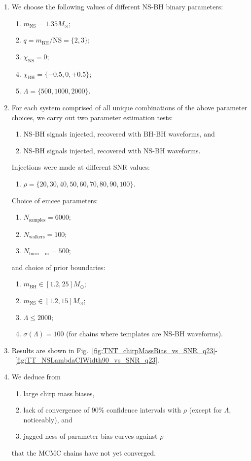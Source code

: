 \documentclass[aps,prd,amsmath,floats,floatfix, twocolumn,
superscriptaddress,nofootinbib,showpacs]{revtex4-1}
\begin{document}
\begin{enumerate}
\item We choose the following values of different NS-BH binary parameters:
\begin{enumerate}
\item $m_\mathrm{NS}=1.35M_\odot$;
\item $q=m_\mathrm{BH}/\mathrm{NS}=\{2,3\}$;
\item $\chi_\mathrm{NS}=0$;
\item $\chi_\mathrm{BH}=\{-0.5, 0, +0.5\}$;
\item $\Lambda =\{500,1000,2000\}$.
\end{enumerate}

\item For each system comprised of all unique combinations of the above 
parameter choices, we carry out two parameter estimation tests: 
\begin{enumerate}
\item NS-BH signals injected, recovered with BH-BH waveforms, and
\item NS-BH signals injected, recovered with NS-BH waveforms.
\end{enumerate}
Injections were made at different SNR values: 
\begin{enumerate}
\item $\rho = \{20, 30, 40, 50, 60, 70, 80, 90, 100\}$.
\end{enumerate}
Choice of emcee parameters:
\begin{enumerate}
\item $N_\mathrm{samples}=6000$; 
\item $N_\mathrm{walkers}=100$; 
\item $N_\mathrm{burn-in}=500$; 
\end{enumerate}
and choice of prior boundaries:
\begin{enumerate} 
\item $m_\mathrm{BH}\in [1.2, 25]M_\odot$;
\item $m_\mathrm{NS}\in [1.2, 15]M_\odot$;
\item $\Lambda\leq 2000$; 
\item $\sigma\left(\Lambda\right) = 100$ (for chains where templates are NS-BH waveforms).
\end{enumerate}

\item Results are shown in
Fig.~\ref{fig:TNT_chirpMassBias_vs_SNR_q23}-~\ref{fig:TT_NSLambdaCIWidth90_vs_SNR_q23}.

\item We deduce from
\begin{enumerate}
\item large chirp mass biases, 
\item lack of convergence of $90\%$ confidence intervals with $\rho$ (except for
$\Lambda$, noticeably), and
\item jagged-ness of parameter bias curves against $\rho$
\end{enumerate}
that the MCMC chains have not yet converged.
\end{enumerate}
\end{document}
